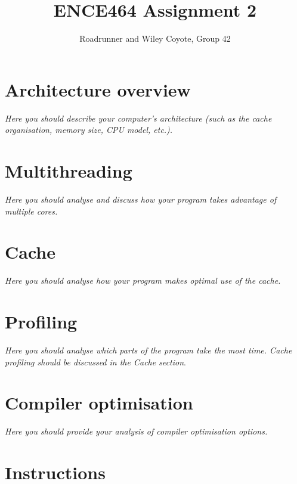 \documentclass[a4paper,12pt]{article}
\title{ENCE464 Assignment 2}
\author{Roadrunner and Wiley Coyote, Group 42}
\date{}
\newcommand{\comment}[1]{\emph{\color{blue}#1}}
\begin{document}
\maketitle

\section{Architecture overview}

\comment{Here you should describe your computer's architecture (such
  as the cache organisation, memory size, CPU model, etc.).}


\section{Multithreading}

\comment{Here you should analyse and discuss how your program takes
  advantage of multiple cores.}


\section{Cache}

\comment{Here you should analyse how your program makes optimal use
  of the cache.}


\section{Profiling}

\comment{Here you should analyse which parts of the program take the
  most time.  Cache profiling should be discussed in the Cache
  section}.


\section{Compiler optimisation}

\comment{Here you should provide your analysis of compiler
  optimisation options.}



\color{blue}
\section*{Instructions}
\end{document}
